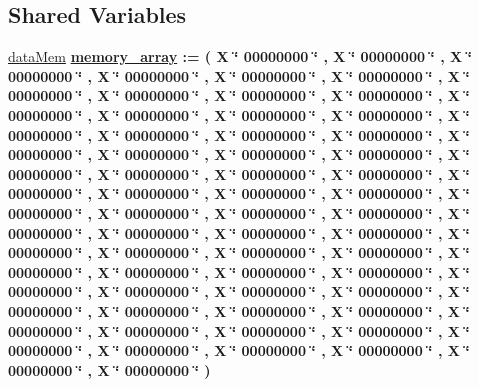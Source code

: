\subsection*{\-Shared \-Variables}
 \begin{DoxyCompactItemize}
\item 
\hyperlink{classdata__memory_1_1behavioral_a2600aba194e7d93337116c95534d00ac}{data\-Mem} {\bfseries {\bfseries \hyperlink{classdata__memory_1_1behavioral_ac31cac8abdfb8b066dcf91fe2b778136}{memory\-\_\-array}}   \-:=  (  \-X \char`\"{} 00000000 \char`\"{} ,  \-X \char`\"{} 00000000 \char`\"{} ,  \-X \char`\"{} 00000000 \char`\"{} ,  \-X \char`\"{} 00000000 \char`\"{} ,  \-X \char`\"{} 00000000 \char`\"{} ,  \-X \char`\"{} 00000000 \char`\"{} ,  \-X \char`\"{} 00000000 \char`\"{} ,  \-X \char`\"{} 00000000 \char`\"{} ,  \-X \char`\"{} 00000000 \char`\"{} ,  \-X \char`\"{} 00000000 \char`\"{} ,  \-X \char`\"{} 00000000 \char`\"{} ,  \-X \char`\"{} 00000000 \char`\"{} ,  \-X \char`\"{} 00000000 \char`\"{} ,  \-X \char`\"{} 00000000 \char`\"{} ,  \-X \char`\"{} 00000000 \char`\"{} ,  \-X \char`\"{} 00000000 \char`\"{} ,  \-X \char`\"{} 00000000 \char`\"{} ,  \-X \char`\"{} 00000000 \char`\"{} ,  \-X \char`\"{} 00000000 \char`\"{} ,  \-X \char`\"{} 00000000 \char`\"{} ,  \-X \char`\"{} 00000000 \char`\"{} ,  \-X \char`\"{} 00000000 \char`\"{} ,  \-X \char`\"{} 00000000 \char`\"{} ,  \-X \char`\"{} 00000000 \char`\"{} ,  \-X \char`\"{} 00000000 \char`\"{} ,  \-X \char`\"{} 00000000 \char`\"{} ,  \-X \char`\"{} 00000000 \char`\"{} ,  \-X \char`\"{} 00000000 \char`\"{} ,  \-X \char`\"{} 00000000 \char`\"{} ,  \-X \char`\"{} 00000000 \char`\"{} ,  \-X \char`\"{} 00000000 \char`\"{} ,  \-X \char`\"{} 00000000 \char`\"{} ,  \-X \char`\"{} 00000000 \char`\"{} ,  \-X \char`\"{} 00000000 \char`\"{} ,  \-X \char`\"{} 00000000 \char`\"{} ,  \-X \char`\"{} 00000000 \char`\"{} ,  \-X \char`\"{} 00000000 \char`\"{} ,  \-X \char`\"{} 00000000 \char`\"{} ,  \-X \char`\"{} 00000000 \char`\"{} ,  \-X \char`\"{} 00000000 \char`\"{} ,  \-X \char`\"{} 00000000 \char`\"{} ,  \-X \char`\"{} 00000000 \char`\"{} ,  \-X \char`\"{} 00000000 \char`\"{} ,  \-X \char`\"{} 00000000 \char`\"{} ,  \-X \char`\"{} 00000000 \char`\"{} ,  \-X \char`\"{} 00000000 \char`\"{} ,  \-X \char`\"{} 00000000 \char`\"{} ,  \-X \char`\"{} 00000000 \char`\"{} ,  \-X \char`\"{} 00000000 \char`\"{} ,  \-X \char`\"{} 00000000 \char`\"{} ,  \-X \char`\"{} 00000000 \char`\"{} ,  \-X \char`\"{} 00000000 \char`\"{} ,  \-X \char`\"{} 00000000 \char`\"{} ,  \-X \char`\"{} 00000000 \char`\"{} ,  \-X \char`\"{} 00000000 \char`\"{} ,  \-X \char`\"{} 00000000 \char`\"{} ,  \-X \char`\"{} 00000000 \char`\"{} ,  \-X \char`\"{} 00000000 \char`\"{} ,  \-X \char`\"{} 00000000 \char`\"{} ,  \-X \char`\"{} 00000000 \char`\"{} ,  \-X \char`\"{} 00000000 \char`\"{} ,  \-X \char`\"{} 00000000 \char`\"{} ,  \-X \char`\"{} 00000000 \char`\"{} ,  \-X \char`\"{} 00000000 \char`\"{}  ) } 
\end{DoxyCompactItemize}


